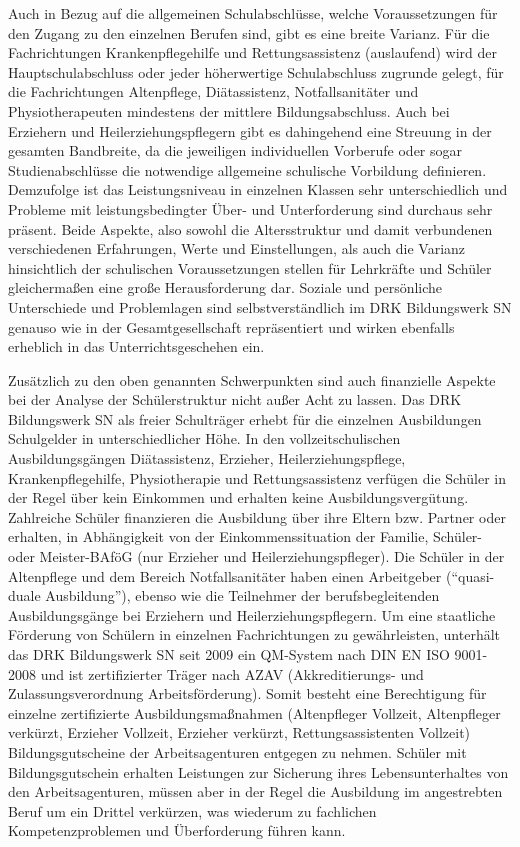 Auch in Bezug auf die allgemeinen Schulabschlüsse, welche Voraussetzungen für den Zugang zu den einzelnen Berufen sind, gibt es eine breite Varianz. Für die Fachrichtungen Krankenpflegehilfe und Rettungsassistenz (auslaufend) wird der Hauptschulabschluss oder jeder höherwertige Schulabschluss zugrunde gelegt, für die Fachrichtungen Altenpflege, Diätassistenz, Notfallsanitäter und Physiotherapeuten mindestens der mittlere Bildungsabschluss. Auch bei Erziehern und Heilerziehungspflegern gibt es dahingehend eine Streuung in der gesamten Bandbreite, da die jeweiligen individuellen Vorberufe oder sogar Studienabschlüsse die notwendige allgemeine schulische Vorbildung definieren. Demzufolge ist das Leistungsniveau in einzelnen Klassen sehr unterschiedlich und Probleme mit leistungsbedingter Über- und Unterforderung sind durchaus sehr präsent. Beide Aspekte, also sowohl die Altersstruktur und damit verbundenen verschiedenen Erfahrungen, Werte und Einstellungen, als auch die Varianz hinsichtlich der schulischen Voraussetzungen  stellen für Lehrkräfte und Schüler gleichermaßen eine große Herausforderung dar. Soziale und persönliche Unterschiede und Problemlagen sind selbstverständlich im DRK Bildungswerk SN genauso wie in der Gesamtgesellschaft repräsentiert und wirken ebenfalls erheblich in das Unterrichtsgeschehen ein. 

Zusätzlich zu den oben genannten Schwerpunkten sind auch finanzielle Aspekte bei der Analyse der Schülerstruktur nicht außer Acht zu lassen. Das DRK Bildungswerk SN als freier Schulträger erhebt für die einzelnen Ausbildungen Schulgelder in unterschiedlicher Höhe. In den vollzeitschulischen Ausbildungsgängen Diätassistenz, Erzieher, Heilerziehungspflege, Krankenpflegehilfe, Physiotherapie und Rettungsassistenz verfügen die Schüler in der Regel über kein Einkommen und erhalten keine Ausbildungsvergütung. Zahlreiche Schüler finanzieren die Ausbildung über ihre Eltern bzw. Partner oder erhalten, in Abhängigkeit von der Einkommenssituation der Familie, Schüler- oder Meister-BAföG (nur Erzieher und Heilerziehungspfleger). Die Schüler in der Altenpflege und dem Bereich Notfallsanitäter haben einen Arbeitgeber ("`quasi-duale Ausbildung"'), ebenso wie die Teilnehmer der berufsbegleitenden Ausbildungsgänge bei Erziehern und Heilerziehungspflegern. Um eine staatliche Förderung von Schülern in einzelnen Fachrichtungen zu gewährleisten, unterhält das DRK Bildungswerk SN seit 2009 ein QM-System nach DIN EN ISO 9001-2008 und ist zertifizierter Träger nach AZAV (Akkreditierungs- und Zulassungsverordnung Arbeitsförderung). Somit besteht eine Berechtigung für einzelne zertifizierte Ausbildungsmaßnahmen (Altenpfleger Vollzeit, Altenpfleger verkürzt, Erzieher Vollzeit, Erzieher verkürzt, Rettungsassistenten Vollzeit) Bildungsgutscheine der Arbeitsagenturen entgegen zu nehmen. Schüler mit Bildungsgutschein erhalten Leistungen zur Sicherung ihres Lebensunterhaltes von den Arbeitsagenturen, müssen aber in der Regel die Ausbildung im angestrebten Beruf um ein Drittel verkürzen, was wiederum zu fachlichen Kompetenzproblemen und Überforderung führen kann.

